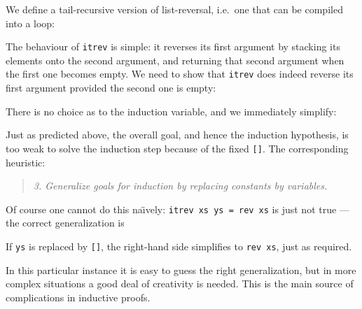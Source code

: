 We define a tail-recursive version of list-reversal,
i.e.\ one that can be compiled into a loop:
\begin{ttbox}
\end{ttbox}
The behaviour of \texttt{itrev} is simple: it reverses its first argument by
stacking its elements onto the second argument, and returning that second
argument when the first one becomes empty.
We need to show that \texttt{itrev} does indeed reverse its first argument
provided the second one is empty:
\begin{ttbox}
\end{ttbox}
There is no choice as to the induction variable, and we immediately simplify:
\begin{ttbox}
\ttbreak\makeatother
{}
\end{ttbox}
Just as predicted above, the overall goal, and hence the induction
hypothesis, is too weak to solve the induction step because of the fixed
\texttt{[]}. The corresponding heuristic:
\begin{quote}
{\em 3. Generalize goals for induction by replacing constants by variables.}
\end{quote}
Of course one cannot do this na\"{\i}vely: \texttt{itrev xs ys = rev xs} is
just not true --- the correct generalization is
\begin{ttbox}\makeatother
\end{ttbox}
If \texttt{ys} is replaced by \texttt{[]}, the right-hand side simplifies to
\texttt{rev xs}, just as required.

In this particular instance it is easy to guess the right generalization,
but in more complex situations a good deal of creativity is needed. This is
the main source of complications in inductive proofs.

